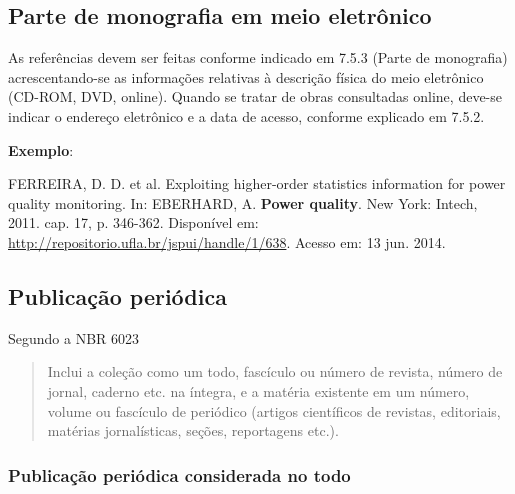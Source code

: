 \subsection{Parte de monografia em meio eletrônico}

As referências devem ser feitas conforme indicado em 7.5.3 (Parte de monografia) acrescentando-se as informações relativas à descrição física do meio eletrônico (CD-ROM, DVD, online). Quando se tratar de obras consultadas online, deve-se indicar o endereço eletrônico e a data de acesso, conforme explicado em 7.5.2.

\begin{exemplomanual}
\textbf{Exemplo}:\\
\begin{singlespace}
FERREIRA, D. D. et al. Exploiting higher-order statistics information for power quality monitoring. In: EBERHARD, A. \textbf{Power quality}. New York: Intech, 2011. cap. 17, p. 346-362. Disponível em:
\url{http://repositorio.ufla.br/jspui/handle/1/638}.  Acesso em: 13 jun. 2014.
\end{singlespace}
\end{exemplomanual}


\subsection{Publicação periódica}

Segundo a NBR 6023 \cite[p.5]{NBR6023:2002}

\begin{quote}
Inclui a coleção como um todo, fascículo ou número de revista, número de jornal, caderno etc. na íntegra, e a matéria existente em um número, volume ou fascículo de periódico (artigos científicos de revistas, editoriais, matérias jornalísticas, seções, reportagens etc.).
\end{quote}


\subsubsection{Publicação periódica considerada no todo}

\begin{flushleft}
\begin{singlespace}
\end{singlespace}
\end{flushleft}

